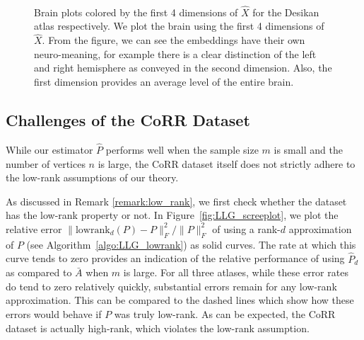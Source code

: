\begin{figure}
\begin{subfigure}[t]{.7\textwidth}
\begin{center}
\end{center}
\end{subfigure}\\
\caption[Brain plots colored by the first 4 dimensions of embedding for the Desikan atlas]{Brain plots colored by the first 4 dimensions of $\hat{X}$ for the Desikan atlas respectively.
We plot the brain using the first 4 dimensions of $\hat{X}$. From the figure, we can see the embeddings have their own neuro-meaning, for example there is a clear distinction of the left and right hemisphere as conveyed in the second dimension. Also, the first dimension provides an average level of the entire brain.}
\label{fig:eigenvector_brain}
\end{figure}



\subsection{Challenges of the CoRR Dataset}

While our estimator $\hat{P}$ performs well when the sample size $m$ is small and the number of vertices $n$ is large, the CoRR dataset itself does not strictly adhere to the low-rank assumptions of our theory.

As discussed in Remark \ref{remark:low_rank}, we first check whether the dataset has the low-rank property or not. In Figure~\ref{fig:LLG_screeplot}, we plot the relative error $\|\mathrm{lowrank}_d(P)-P\|_F^2/\|P\|_F^2$ of using a rank-$d$ approximation of $P$ (see Algorithm~\ref{algo:LLG_lowrank}) as solid curves.
The rate at which this curve tends to zero provides an indication of the relative performance of using $\hat{P}_d$ as compared to $\bar{A}$ when $m$ is large. 
For all three atlases, while these error rates do tend to zero relatively quickly, substantial errors remain for any low-rank approximation.
This can be compared to the dashed lines which show how these errors would behave if $P$ was truly low-rank.
As can be expected, the CoRR dataset is actually high-rank, which violates the low-rank assumption.


